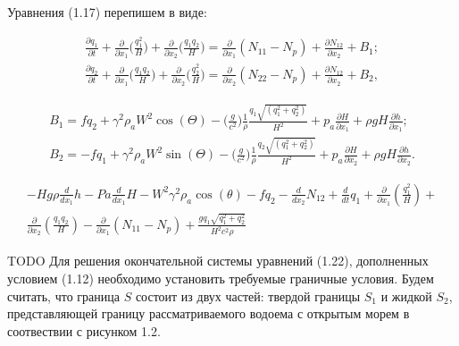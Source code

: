 \documentclass[14pt]{extreport}
\begin{document}
Уравнения (1.17) перепишем в виде:


\begin{eqnarray} 
\frac{\partial q_1}{\partial t} + \frac{\partial}{\partial x_1} \bigg(\frac{q_1^2}{H}\bigg)+\frac{\partial }{\partial x_2}\bigg(\frac{q_1 q_2}{H}\bigg) = \frac{\partial}{\partial x_1} (N_{11}-N_p) + \frac{\partial N_{12}}{\partial x_2} + B_1; \nonumber\\
\frac{\partial q_2}{\partial t} + \frac{\partial}{\partial x_1} \bigg(\frac{q_1 q_2}{H}\bigg)+\frac{\partial }{\partial x_2}\bigg(\frac{q_2^2}{H}\bigg) = \frac{\partial}{\partial x_2} (N_{22}-N_p) + \frac{\partial N_{12}}{\partial x_2} + B_2,
\end{eqnarray}


\begin{eqnarray}
B_1=fq_2+\gamma^2\rho_aW^2\cos(\Theta)-\bigg(\frac{g}{c^2}\bigg)\frac{1}{\rho}\frac{q_1\sqrt{(q_1^2+q_2^2)}}{H^2} + p_a \frac{\partial H}{\partial x_1} + \rho gH\frac{\partial h}{\partial x_1}; \nonumber\\
B_2=-fq_1+\gamma^2\rho_aW^2\sin(\Theta)-\bigg(\frac{g}{c^2}\bigg)\frac{1}{\rho}\frac{q_2\sqrt{(q_1^2+q_2^2)}}{H^2} + p_a \frac{\partial H}{\partial x_2} + \rho gH\frac{\partial h}{\partial x_2}.
\end{eqnarray}



\begin{eqnarray}
- H g \rho \frac{d}{d x_{1}} h - Pa \frac{d}{d x_{1}} H - W^{2} \gamma^{2} \rho_{a} \cos{\left (\theta \right )} - f q_{2} - \frac{d}{d x_{2}} N_{12} + \frac{d}{d t} q_{1} + \frac{\partial}{\partial x_{1}}\left(\frac{q_{1}^{2}}{H}\right) +\\ \frac{\partial}{\partial x_{2}}\left(\frac{q_{1} q_{2}}{H}\right) - \frac{\partial}{\partial x_{1}}\left(N_{11} - N_{p}\right) + \frac{g q_{1} \sqrt{q_{1}^{2} + q_{2}^{2}}}{H^{2} c^{2} \rho}


\end{eqnarray}




TODO 
Для решения окончательной системы уравнений (1.22), дополненных условием (1.12) необходимо установить требуемые граничные условия. Будем считать, что граница $S$ состоит из двух частей: твердой границы $S_1$ и жидкой $S_2$, представляющей границу рассматриваемого водоема с открытым морем в соотвествии с рисунком 1.2.

\end{document}
